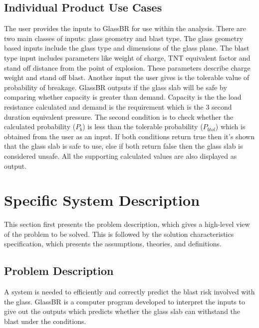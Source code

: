 \documentclass[12pt]{article}
\begin{document}
\subsection{Individual Product Use Cases}
\label{Sec:IndividualProdUC}
The user provides the inputs to GlassBR for use within the analysis. There are two main classes of inputs: glass geometry and blast type. The glass geometry based inputs include the glass type and dimensions of the glass plane. The blast type input includes parameters like weight of charge, TNT equivalent factor and stand off distance from the point of explosion. These parameters describe charge weight and stand off blast. Another input the user gives is the tolerable value of probability of breakage. GlassBR outputs if the glass slab will be safe by comparing whether capacity is greater than demand. Capacity is the the load resistance calculated and demand is the requirement which is the 3 second duration equivalent pressure. The second condition is to check whether the calculated probability (${P_{b}}$) is less than the tolerable probability (${P_{btol}}$) which is obtained from the user as an input. If both conditions return true then it's shown that the glass slab is safe to use, else if both return false then the glass slab is considered unsafe. All the supporting calculated values are also displayed as output.
\section{Specific System Description}
\label{Sec:SpecSystDesc}
This section first presents the problem description, which gives a high-level view of the problem to be solved. This is followed by the solution characteristics specification, which presents the assumptions, theories, and definitions.
\subsection{Problem Description}
\label{Sec:ProbDesc}
A system is needed to efficiently and correctly predict the blast risk involved with the glass. GlassBR is a computer program developed to interpret the inputs to give out the outputs which predicts whether the glass slab can withstand the blast under the conditions.
\end{document}
